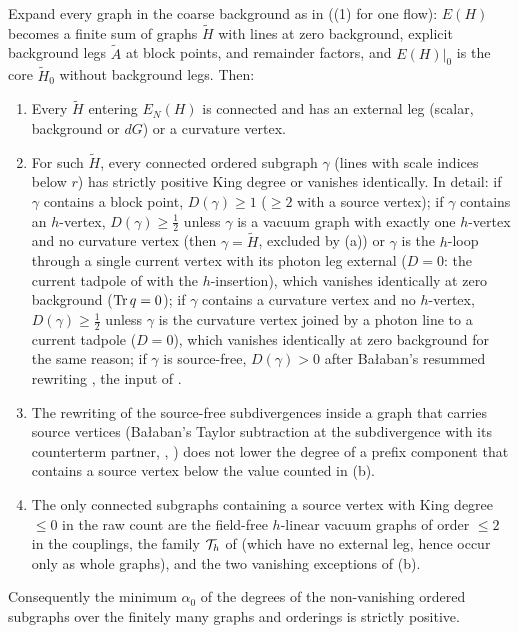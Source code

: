 \begin{lemma}\label{rot:lem:H6census}
Expand every graph in the coarse background as in \cite[(3.43)--(3.55)]{K1} ((1) for one flow): $E(H)$ becomes a finite sum of graphs $\tilde H$ with lines at zero background, explicit background legs $\tilde A$ at block points, and remainder factors, and $E(H)|_0$ is the core $\tilde H_0$ without background legs. Then:
\begin{enumerate}[label=\textup{(\alph*)},leftmargin=*]
\item Every $\tilde H$ entering $E_N(H)$ is connected and has an external leg (scalar, background or $dG$) or a curvature vertex.
\item For such $\tilde H$, every connected ordered subgraph $\gamma$ (lines with scale indices below $r$) has strictly positive King degree or vanishes identically. In detail: if $\gamma$ contains a block point, $D(\gamma)\ge1$ ($\ge2$ with a source vertex); if $\gamma$ contains an $h$-vertex, $D(\gamma)\ge\frac12$ unless $\gamma$ is a vacuum graph with exactly one $h$-vertex and no curvature vertex (then $\gamma=\tilde H$, excluded by (a)) or $\gamma$ is the $h$-loop through a single current vertex \cite[(3.22)]{K1} with its photon leg external ($D=0$: the current tadpole of  with the $h$-insertion), which vanishes identically at zero background ($\operatorname{Tr} q=0$); if $\gamma$ contains a curvature vertex and no $h$-vertex, $D(\gamma)\ge\frac12$ unless $\gamma$ is the curvature vertex joined by a photon line to a current tadpole ($D=0$), which vanishes identically at zero background for the same reason; if $\gamma$ is source-free, $D(\gamma)>0$ after Ba{\l}aban's resummed rewriting \cite[(3.5)]{Ba3}, the input of .
\item The rewriting of the source-free subdivergences inside a graph that carries source vertices (Ba{\l}aban's Taylor subtraction at the subdivergence with its counterterm partner, \cite[(3.5)]{Ba3}, \cite[(3.83)--(3.85)]{K1}) does not lower the degree of a prefix component that contains a source vertex below the value counted in (b).
\item The only connected subgraphs containing a source vertex with King degree $\le0$ in the raw count are the field-free $h$-linear vacuum graphs of order $\le2$ in the couplings, the family $\mathcal T_h$ of  (which have no external leg, hence occur only as whole graphs), and the two vanishing exceptions of (b).
\end{enumerate}
Consequently the minimum $\alpha_0$ of the degrees of the non-vanishing ordered subgraphs over the finitely many graphs and orderings is strictly positive.
\end{lemma}
